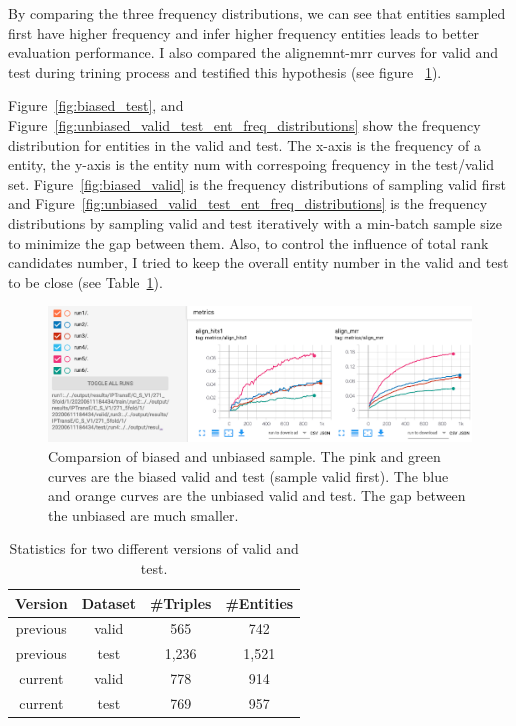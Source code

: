 By comparing the three frequency distributions, we can see that entities sampled first have higher frequency and infer higher frequency entities leads to better evaluation performance.  
I also compared the alignemnt-mrr curves for valid and test during trining process and testified this hypothesis (see figure ~\ref{fig:comparision_of_different_sample_valid_test_order}).

Figure~\ref{fig:biased_test}, and Figure~\ref{fig:unbiased_valid_test_ent_freq_distributions} show the frequency distribution for entities in the valid and test. 
The x-axis is the frequency of a entity, the y-axis is the entity num with correspoing frequency in the test/valid set. Figure~\ref{fig:biased_valid} is the frequency distributions of sampling valid first and Figure~\ref{fig:unbiased_valid_test_ent_freq_distributions} is the frequency distributions by sampling valid and test iteratively with a min-batch sample size to minimize the gap between them. Also, to control the influence of total rank candidates number, I tried to keep the overall entity number in the valid and test to be close (see Table~\ref{tab:statistics_two_versions_valid_test}).

\begin{figure}[!ht]
    \centering
    \includegraphics[width=\textwidth]{images/0616/comparision_of_different_sample_valid_test_order.png}
    \caption{\label{fig:comparision_of_different_sample_valid_test_order} Comparsion of biased and unbiased sample. The pink and green curves are the biased valid and test (sample valid first). The blue and orange curves are the unbiased valid and test. The gap between the unbiased are much smaller. }
\end{figure}

\begin{table}[H]
    \centering
    \begin{tabular}{cccc}
        \hline
        Version &Dataset & \#Triples &\#Entities \\
        \hline
        previous & valid & 565	&742\\
        previous & test & 1,236	&1,521\\
        \hline
        current & valid & 778	& 914\\
        current & test & 769	& 957\\
        \hline
    \end{tabular}
    \caption{\label{tab:statistics_two_versions_valid_test} Statistics for two different versions of valid and test.}
    
\end{table}

